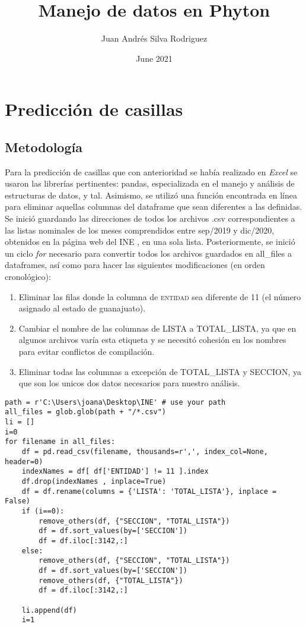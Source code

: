\documentclass{article}
\title{Manejo de datos en Phyton}
\author{Juan Andrés Silva Rodriguez }
\date{June 2021}
\begin{document}
\maketitle

\section{Predicción de casillas}

\subsection{Metodología}
Para la predicción de casillas que con anterioridad se había realizado en \textit{Excel} se usaron las librerías pertinentes: pandas, especializada en el manejo y análisis de estructuras de datos, y tal. Asimismo, se utilizó una función encontrada en línea para eliminar aquellas columnas del dataframe que sean diferentes a las definidas.\\

Se inició guardando las direcciones de todos los archivos .csv correspondientes a las listas nominales de los meses comprendidos entre sep/2019 y dic/2020, obtenidos en la página web del INE \cite{Data}, en una sola lista. Posteriormente, se inició un ciclo \textit{for} necesario para convertir todos los archivos guardados en all\_files a dataframes, así como para hacer las siguientes modificaciones (en orden cronológico):
\begin{enumerate}
    \item Eliminar las filas donde la columna de \textsc{entidad} sea diferente de 11 (el número asignado al estado de guanajuato).
    
    \item Cambiar el nombre de las columnas de LISTA a TOTAL\_LISTA, ya que en algunos archivos varía esta etiqueta y se necesitó cohesión en los nombres para evitar conflictos de compilación.
    
    \item Eliminar todas las columnas a excepción de TOTAL\_LISTA y SECCION, ya que son los unicos dos datos necesarios para nuestro análisis.
\end{enumerate}

\begin{lstlisting}
path = r'C:\Users\joana\Desktop\INE' # use your path
all_files = glob.glob(path + "/*.csv")
li = []
i=0
for filename in all_files:
    df = pd.read_csv(filename, thousands=r',', index_col=None, header=0)
    indexNames = df[ df['ENTIDAD'] != 11 ].index
    df.drop(indexNames , inplace=True)
    df = df.rename(columns = {'LISTA': 'TOTAL_LISTA'}, inplace = False)
    if (i==0):
        remove_others(df, {"SECCION", "TOTAL_LISTA"})
        df = df.sort_values(by=['SECCION'])
        df = df.iloc[:3142,:]
    else:
        remove_others(df, {"SECCION", "TOTAL_LISTA"})
        df = df.sort_values(by=['SECCION'])
        remove_others(df, {"TOTAL_LISTA"})
        df = df.iloc[:3142,:]
        
    li.append(df)
    i=1
\end{lstlisting}
    
\end{document}
